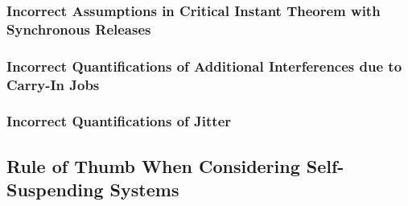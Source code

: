\subsubsection{Incorrect Assumptions in Critical Instant Theorem with Synchronous Releases}
\label{sec:wrong-critical}

\subsubsection{Incorrect Quantifications of Additional Interferences due to Carry-In Jobs}
\label{sec:wrong-carryin}

\subsubsection{Incorrect Quantifications of Jitter}
\label{sec:wrong-jitter}

\subsection{Rule of Thumb When Considering Self-Suspending Systems}
  
  
  
  
  
  
  
  
  
  
  
  
  
  
  
  
  




